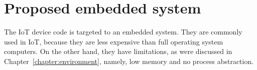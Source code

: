 %





\section{Proposed embedded system}


The IoT device code is targeted to an embedded system. They are commonly used in IoT, because they are less expensive than full operating system computers. On the other hand, they have limitations, as were discussed in Chapter~\ref{chapter:environment}, namely, low memory and no process abstraction.

